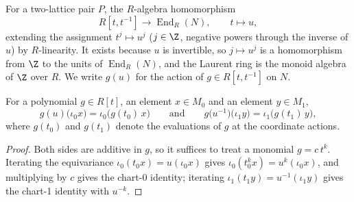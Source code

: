 \begin{definition}
  \label{def:twoLattice_laurentToEnd}
  \leanok
  For a two-lattice pair \(P\), the \(R\)-algebra homomorphism
  \[
    R[t, t^{-1}] \longrightarrow \operatorname{End}_R(N), \qquad t \longmapsto u ,
  \]
  extending the assignment \(t^j \mapsto u^j\) (\(j \in \Z\), negative powers through
  the inverse of \(u\)) by \(R\)-linearity. It exists because \(u\) is invertible, so
  \(j \mapsto u^j\) is a homomorphism from \(\Z\) to the units of
  \(\operatorname{End}_R(N)\), and the
  Laurent ring is the monoid algebra of \(\Z\) over \(R\). We write \(g(u)\) for the
  action of \(g \in R[t,t^{-1}]\) on \(N\).
\end{definition}

\begin{lemma}
  \label{lem:twoLattice_laurent_intertwine}
  \leanok
  For a polynomial \(g \in R[t]\), an element \(x \in M_0\) and an element
  \(y \in M_1\),
  \[
    g(u)\bigl(\iota_0 x\bigr) = \iota_0\bigl(g(t_0)\, x\bigr)
    \qquad\text{and}\qquad
    g\bigl(u^{-1}\bigr)\bigl(\iota_1 y\bigr) = \iota_1\bigl(g(t_1)\, y\bigr) ,
  \]
  where \(g(t_0)\) and \(g(t_1)\) denote the evaluations of \(g\) at the coordinate
  actions.
\end{lemma}
\begin{proof}
  \leanok
  Both sides are additive in \(g\), so it suffices to treat a monomial
  \(g = c\,t^k\). Iterating the equivariance \(\iota_0(t_0 x) = u(\iota_0 x)\) gives
  \(\iota_0(t_0^k x) = u^k(\iota_0 x)\), and multiplying by \(c\) gives the chart-0
  identity; iterating \(\iota_1(t_1 y) = u^{-1}(\iota_1 y)\) gives the chart-1
  identity with \(u^{-k}\).
\end{proof}

